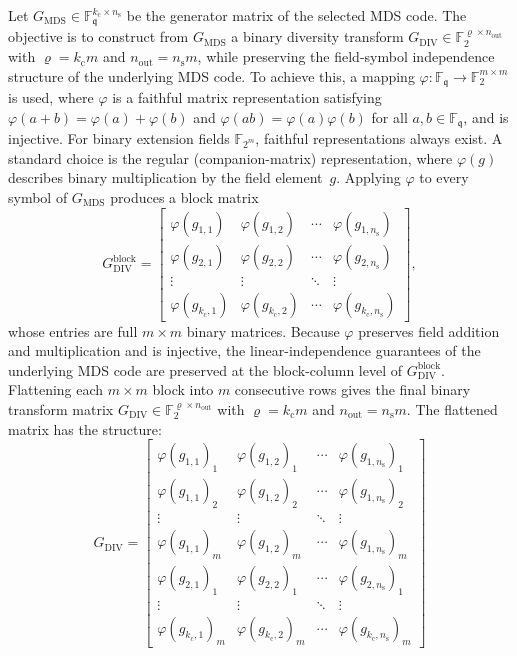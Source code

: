 \documentclass[lettersize,journal]{IEEEtran}
\begin{document}
Let $G_{\mathrm{MDS}} \in 
\mathbb{F}_{\mathfrak{q}}^{k_{\mathrm{c}} \times n_{\mathrm{s}}}$ 
be the generator matrix of the selected MDS code. The objective is 
to construct from $G_{\mathrm{MDS}}$ a binary diversity transform 
$G_{\mathrm{DIV}} \in \mathbb{F}_{2}^{\varrho \times n_{\text{out}}}$ 
with $\varrho = k_{\mathrm{c}} m$ and $n_{\text{out}} = n_{\mathrm{s}} m$, 
while preserving the field-symbol independence structure of the 
underlying MDS code. To achieve this, a mapping $\varphi : \mathbb{F}_{\mathfrak{q}} 
\rightarrow \mathbb{F}_{2}^{m \times m}$ is used, where $\varphi$ 
is a faithful matrix representation satisfying 
$\varphi(a+b)=\varphi(a)+\varphi(b)$ and 
$\varphi(ab)=\varphi(a)\varphi(b)$ for all 
$a,b\in\mathbb{F}_{\mathfrak{q}}$, and is injective. For 
binary extension fields $\mathbb{F}_{2^{m}}$, faithful 
representations always exist. A standard choice is the regular 
(companion-matrix) representation, where $\varphi(g)$ describes 
binary multiplication by the field element~$g$. Applying $\varphi$ to every symbol of $G_{\mathrm{MDS}}$ produces 
a block matrix
\[
G_{\mathrm{DIV}}^{\mathrm{block}}
=
\begin{bmatrix}
\varphi(g_{1,1}) & \varphi(g_{1,2}) & \cdots & 
\varphi(g_{1,n_{\mathrm{s}}}) \\
\varphi(g_{2,1}) & \varphi(g_{2,2}) & \cdots & 
\varphi(g_{2,n_{\mathrm{s}}}) \\
\vdots & \vdots & \ddots & \vdots \\
\varphi(g_{k_{\mathrm{c}},1}) & \varphi(g_{k_{\mathrm{c}},2}) & 
\cdots & \varphi(g_{k_{\mathrm{c}},n_{\mathrm{s}}})
\end{bmatrix},
\]
whose entries are full $m \times m$ binary matrices. Because 
$\varphi$ preserves field addition and multiplication and is 
injective, the linear-independence guarantees of the underlying MDS 
code are preserved at the block-column level of 
$G_{\mathrm{DIV}}^{\mathrm{block}}$. Flattening each $m \times m$ block into $m$ consecutive rows gives 
the final binary transform matrix 
$G_{\mathrm{DIV}} \in \mathbb{F}_{2}^{\varrho \times n_{\text{out}}}$ 
with $\varrho = k_{\mathrm{c}} m$ and $n_{\text{out}} = n_{\mathrm{s}} m$.
The flattened matrix has the structure:
\[
G_{\mathrm{DIV}} = 
\begin{bmatrix}
\varphi(g_{1,1})_1 & \varphi(g_{1,2})_1 & \cdots & 
\varphi(g_{1,n_{\mathrm{s}}})_1 \\
\varphi(g_{1,1})_2 & \varphi(g_{1,2})_2 & \cdots & 
\varphi(g_{1,n_{\mathrm{s}}})_2 \\
\vdots & \vdots & \ddots & \vdots \\
\varphi(g_{1,1})_m & \varphi(g_{1,2})_m & \cdots & 
\varphi(g_{1,n_{\mathrm{s}}})_m \\
\varphi(g_{2,1})_1 & \varphi(g_{2,2})_1 & \cdots & 
\varphi(g_{2,n_{\mathrm{s}}})_1 \\
\vdots & \vdots & \ddots & \vdots \\
\varphi(g_{k_{\mathrm{c}},1})_m & \varphi(g_{k_{\mathrm{c}},2})_m 
& \cdots & \varphi(g_{k_{\mathrm{c}},n_{\mathrm{s}}})_m
\end{bmatrix}
\]
\end{document}
